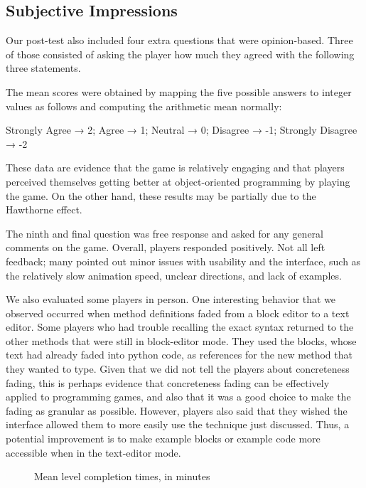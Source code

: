 \documentclass[12pt,notitlepage]{article}
\begin{document}
\subsection{Subjective Impressions}

Our post-test also included four extra questions that were opinion-based.
Three of those consisted of asking the player how much they agreed with
the following three statements.



The mean scores were obtained by mapping the five possible answers to integer
values as follows and computing the arithmetic mean normally:\\
\centerline{Strongly Agree → 2; Agree → 1; Neutral → 0; Disagree → -1; Strongly Disagree → -2}

These data are evidence that the game is relatively engaging and that players
perceived themselves getting better at object-oriented programming by playing
the game. On the other hand, these results may be partially due to the
Hawthorne effect.

The ninth and final question was free response and asked for any general
comments on the game. Overall, players responded positively. Not all left
feedback; many pointed out minor issues with usability and the interface,
such as the relatively slow animation speed, unclear directions, and lack
of examples.

We also evaluated some players in person.
One interesting behavior that we observed occurred when method definitions
faded from a block editor to a text editor. Some players who had trouble
recalling the exact syntax returned to the other methods that were still in
block-editor mode. They used the blocks, whose text had already faded into
python code, as references for the new method that they wanted to type. Given
that we did not tell the players about concreteness fading, this is perhaps
evidence that concreteness fading can be effectively applied to programming
games, and also that it was a good choice to make the fading as granular as
possible. However, players also said that they wished the interface allowed
them to more easily use the technique just discussed. Thus, a potential
improvement is to make example blocks or example code more accessible when
in the text-editor mode.

\begin{figure}
  \centering
  \caption{Mean level completion times, in minutes}\label{fig:level-completion-time}
\end{figure}
\end{document}
